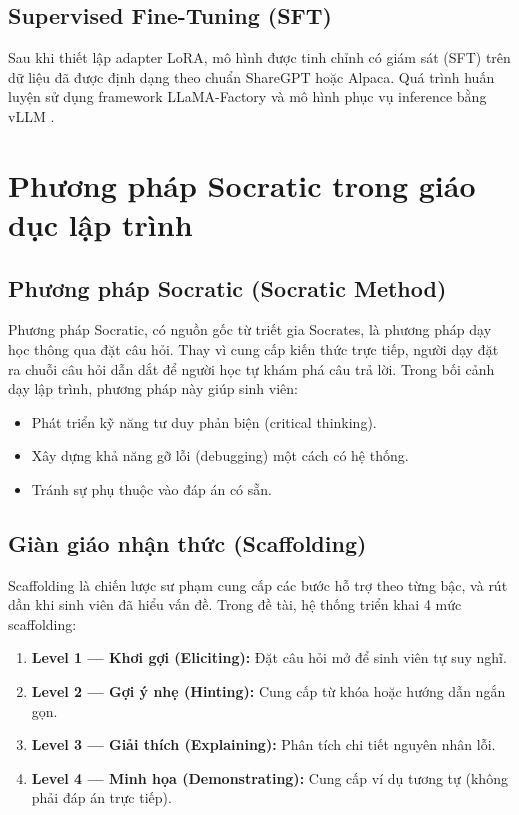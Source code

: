 \subsection{Supervised Fine-Tuning (SFT)}

Sau khi thiết lập adapter LoRA, mô hình được tinh chỉnh có giám sát (SFT) trên dữ liệu đã được định dạng theo chuẩn ShareGPT hoặc Alpaca. Quá trình huấn luyện sử dụng framework LLaMA-Factory \cite{llamafactory} và mô hình phục vụ inference bằng vLLM \cite{vllm}.

\section{Phương pháp Socratic trong giáo dục lập trình}

\subsection{Phương pháp Socratic (Socratic Method)}

Phương pháp Socratic, có nguồn gốc từ triết gia Socrates, là phương pháp dạy học thông qua đặt câu hỏi. Thay vì cung cấp kiến thức trực tiếp, người dạy đặt ra chuỗi câu hỏi dẫn dắt để người học tự khám phá câu trả lời. Trong bối cảnh dạy lập trình, phương pháp này giúp sinh viên:

\begin{itemize}
    \item Phát triển kỹ năng tư duy phản biện (critical thinking).
    \item Xây dựng khả năng gỡ lỗi (debugging) một cách có hệ thống.
    \item Tránh sự phụ thuộc vào đáp án có sẵn.
\end{itemize}

\subsection{Giàn giáo nhận thức (Scaffolding)}

Scaffolding là chiến lược sư phạm cung cấp các bước hỗ trợ theo từng bậc, và rút dần khi sinh viên đã hiểu vấn đề. Trong đề tài, hệ thống triển khai 4 mức scaffolding:

\begin{enumerate}
    \item \textbf{Level 1 --- Khơi gợi (Eliciting):} Đặt câu hỏi mở để sinh viên tự suy nghĩ.
    \item \textbf{Level 2 --- Gợi ý nhẹ (Hinting):} Cung cấp từ khóa hoặc hướng dẫn ngắn gọn.
    \item \textbf{Level 3 --- Giải thích (Explaining):} Phân tích chi tiết nguyên nhân lỗi.
    \item \textbf{Level 4 --- Minh họa (Demonstrating):} Cung cấp ví dụ tương tự (không phải đáp án trực tiếp).
\end{enumerate}

